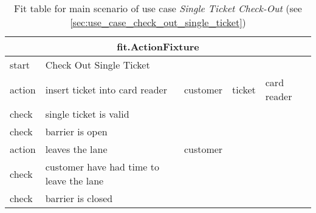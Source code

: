 \begin{table}[H]
\begin{centering}
\begin{tabular}{|l|l|l|l|l|}

\hline  \multicolumn{5}{|c|}{fit.ActionFixture} \\
\hline start & Check Out Single Ticket &  \multicolumn{3}{|c|}{ }  \\ 
\hline action & insert ticket into card reader & customer & ticket  & card reader \\ 
\hline check & single ticket is valid &  \multicolumn{3}{|c|}{ }\\ 
\hline check & barrier is open &  \multicolumn{3}{|c|}{ }   \\ 
\hline action & leaves the lane & customer &  \multicolumn{2}{|c|}{ }  \\
\hline check & customer have had time to leave the lane &  \multicolumn{3}{|c|}{ }   \\ 
\hline check & barrier is closed &  \multicolumn{3}{|c|}{ }   \\ 
\hline
\end{tabular}
\par\end{centering}

\caption{Fit table for main scenario of use case \emph{Single Ticket Check-Out} (see \autoref{sec:use_case_check_out_single_ticket})}
\end{table}